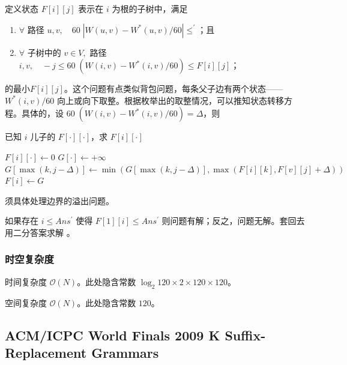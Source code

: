 				定义状态 $F[i][j]$ 表示在 $i$ 为根的子树中，满足
				\begin{enumerate}
					\item $\forall$ 路径  $ u, v, \quad 60 \;|W(u, v) - W^*(u, v) / 60 | \le ^\prime$；且
			 		\item $\forall $ 子树中的 $ v \in V, $ 路径 $i, v, \quad -j \le 60 \;( W(i, v) - W^*(i, v) / 60 ) \le F[i][j]$；
				\end{enumerate}
				的最小$ F[i][j]$。这个问题有点类似背包问题，每条父子边有两个状态——$W^*(i, v) / 60$ 向上或向下取整。根据枚举出的取整情况，可以推知状态转移方程。具体的，设 $60 \;( W(i, v) - W^*(i, v) / 60 ) = \Delta $，则 %
				\begin{algorithm}[H]
				\caption{已知 $i$ 儿子的 $F[\cdot][\cdot]$，求 $F[i][\cdot]$ }
				\label{}
					\begin{algorithmic}[1]
						\State $F[i][\cdot] \gets 0$
							\State $G[\cdot] \gets + \infty$
							\For{$\Delta$}
											\State $G[\max(k, j - \Delta)] \gets \min(G[\max(k, j - \Delta)], \max(F[i][k], F[v][j] + \Delta))$
										\EndIf
									\EndFor
								\EndFor
								\State $F[i] \gets G$
							\EndFor
						\EndFor
					\end{algorithmic}
				\end{algorithm}
				须具体处理边界的溢出问题。
				
				如果存在 $i \le Ans^\prime$ 使得 $F[1][i] \le Ans^\prime$ 则问题有解；反之，问题无解。套回去用二分答案求解
				。


			\subsubsection{时空复杂度}
				时间复杂度 $\mathcal{O}\left(N\right)$。此处隐含常数 $\log_2 120 \times 2 \times 120 \times 120$。
					
				空间复杂度 $\mathcal{O}\left(N\right)$。此处隐含常数 $120$。
		\newpage
		\subsection{ACM/ICPC World Finals 2009 K Suffix-Replacement Grammars}
